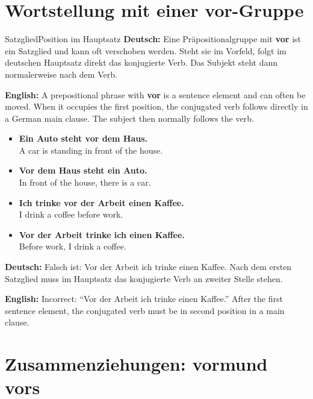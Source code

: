 \documentclass[a4paper,11pt]{article}
\newcommand{\GermanText}[1]{\textbf{Deutsch: }#1\par}
\newcommand{\EnglishText}[1]{{\small\color{SoftGray}\textbf{English: }#1\par}}
\newcommand{\ExampleItem}[2]{\item \textbf{#1}\\{\small\color{SoftGray}#2}}
\begin{document}
    \section{Wortstellung mit einer \glqq vor\grqq-Gruppe}

        \begin{grammarentry}{Satzglied}{Position im Hauptsatz}
            \GermanText{Eine Präpositionalgruppe mit \textbf{vor} ist ein Satzglied und kann oft verschoben werden. Steht sie im Vorfeld, folgt im deutschen Hauptsatz direkt das konjugierte Verb. Das Subjekt steht dann normalerweise nach dem Verb.}
            \EnglishText{A prepositional phrase with \textbf{vor} is a sentence element and can often be moved. When it occupies the first position, the conjugated verb follows directly in a German main clause. The subject then normally follows the verb.}
        \end{grammarentry}

        \begin{exbox}
            \begin{itemize}
                \ExampleItem{Ein Auto steht vor dem Haus.}{A car is standing in front of the house.}
                \ExampleItem{Vor dem Haus steht ein Auto.}{In front of the house, there is a car.}
                \ExampleItem{Ich trinke vor der Arbeit einen Kaffee.}{I drink a coffee before work.}
                \ExampleItem{Vor der Arbeit trinke ich einen Kaffee.}{Before work, I drink a coffee.}
            \end{itemize}
        \end{exbox}

        \begin{warningbox}
            \GermanText{Falsch ist: \glqq Vor der Arbeit ich trinke einen Kaffee.\grqq{} Nach dem ersten Satzglied muss im Hauptsatz das konjugierte Verb an zweiter Stelle stehen.}
            \EnglishText{Incorrect: ``Vor der Arbeit ich trinke einen Kaffee.'' After the first sentence element, the conjugated verb must be in second position in a main clause.}
        \end{warningbox}


    \section{Zusammenziehungen: \glqq vorm\grqq und \glqq vors\grqq}
\end{document}
